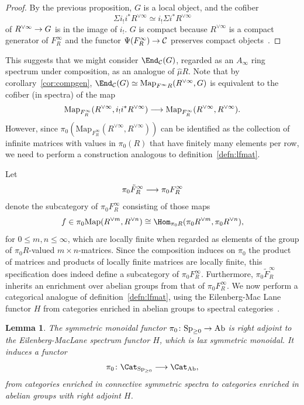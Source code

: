 \documentclass{amsart}
\renewcommand{\to}{\mathchoice{\longrightarrow}{\rightarrow}{\rightarrow}{\rightarrow}}
\let\catsymbfont\mathcal
\newcommand{\aC}{{\catsymbfont{C}}}
\newcommand{\Map}{\mathrm{Map}}%
\newcommand{\Sp}{\mathrm{Sp}}%
\numberwithin{equation}{section}
\newtheorem{lemma}[equation]{Lemma}
\theoremstyle{definition}
\begin{document}
\begin{proof}
By the previous proposition, $G$ is a local object, and the cofiber
\[
\Sigma i_!i^* R^{\lor\infty}\simeq i_!\Sigma i^* R^{\lor\infty}
\]
of $R^{\lor\infty}\to G$ is in the image of $i_!$.  $G$ is compact
because $R^{\lor \infty}$ is a compact generator of $F^\infty_R$ and
the functor $\Psi(F^\infty_R)\to\aC$ preserves compact
objects~\cite[2.9]{Marco}.
\end{proof}

This suggests that we might consider $\End_{\aC}(G)$, regarded as an
$A_\infty$ ring spectrum under composition, as an analogue of
$\hat{\mu}R$.  Note that by corollary~\ref{cor:compgen},
$\End_{\aC}(G)\simeq\Map_{F^\infty R}(R^{\lor\infty}, G)$ is 
equivalent to the cofiber (in spectra) of the map  
\[
\Map_{F^\infty_R}(R^{\lor\infty},i_!
i^*R^{\lor\infty})\to \Map_{F^\infty_R}(R^{\lor \infty}, R^{\lor \infty}).
\]
However, since $\pi_0(\Map_{F^\infty_R}(R^{\lor \infty},
R^{\lor \infty}))$ can be identified as the collection of infinite
matrices with values in $\pi_0(R)$ that have finitely many elements
per row, we need to perform a construction analogous to
definition~\ref{defn:lfmat}.

Let
\[
\pi_0\tilde{F}_R^\infty\to\pi_0 F_R^\infty
\]
denote the subcategory of $\pi_0 F_R^\infty$ consisting of those maps
\[
f\in\pi_0\Map(R^{\lor m}, R^{\lor n})\cong\Hom_{\pi_0 R}(\pi_0 R^{\lor m},\pi_0 R^{\lor n}),
\]
for $0\leq m,n\leq\infty$, which are locally finite when regarded as
elements of the group of $\pi_0 R$-valued $m \times n$-matrices.
Since the composition induces on $\pi_0$ the product of matrices and
products of locally finite matrices are locally finite, this
specification does indeed define a subcategory of $\pi_0 F_R^\infty$.
Furthermore, $\pi_0 \tilde{F}_R^{\infty}$ inherits an enrichment over
abelian groups from that of $\pi_0 F_R^\infty$.  We now perform a
categorical analogue of definition~\ref{defn:lfmat}, using the
Eilenberg-Mac Lane functor $H$ from categories enriched in abelian
groups to spectral categories~\cite[5.1.5]{SS}.

\begin{lemma}
The symmetric monoidal functor $\pi_0 \colon \Sp_{\geq
0}\to\mathrm{Ab}$ is right adjoint to the Eilenberg-MacLane spectrum
functor $H$, which is lax symmetric monoidal.  It induces a functor
\[
\pi_0 \colon \Cat_{\mathrm{Sp}_{\geq 0}}\to\Cat_{\mathrm{Ab}},
\]
from categories enriched in connective symmetric spectra to categories
enriched in abelian groups with right adjoint $H$. 
\end{lemma}
\end{document}
